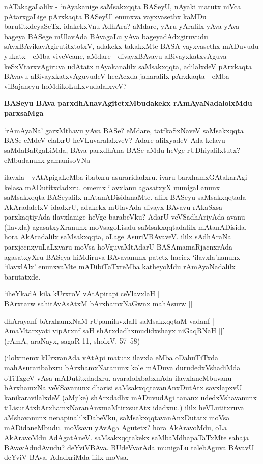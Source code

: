 nATakagaLalilx - `nAyakanige saMsakxqqta BASeyU, nAyaki matutx niVca pAtarxgaLige pArxkaqta BASeyU' enunxva vayxvasethx kaMDu barutitxdeyaSeTx. idakekxVnu AdhAra? aMdare, yAru yAralilx yAva yAva bageya BASege mUlavAda BAvagaLu yAva bageyadAdxgiruvudu sAvxBAvikavAgirutitxtotxV, adakekx takakxMte BASA vayxvasethx mADuvudu yukatx - eMba viveVcane, aMdare - divayxBAvavu aBivayxkatxvAguva keSxVtarxvAgiruva udAtatx nAyakanalilx saMsakxqqta, adilalxdeV pArxkaqta BAvavu aBivayxkatxvAguvudeV hecAcxda jana\-ralilx pArxkaqta - eMba viBajaneyu hoMdikoLuLxvudalalxveV?

{\bigskip
\noindent
{\large\bf BASeyu BAva parxdhAnavAgitetxMbudakekx rAmAyaNadalolxMdu parxsaMga}}\label{page13}
\medskip

\noindent
`rAmAyaNa' garxMthavu yAva BASe? eMdare, tatfkaSxNaveV saMsakxqqta BASe eMdeV elalxrU heVLuva\-ralalxveV? Adare alilxyadeV Ada kelavu saMdaBaRgaLiMda, BAva parxdhAna BASe aMdu heVge rUDhi\-yalilxtutx? eMbudanunx gamanisoVNa -

ilavxla - vAtApigaLeMba ibabxru asuraridadxru. ivaru barxhamxGAtakarAgi kelasa mADutitxdadxru. omemx ilavxlanu agasatxyX munigaLanunx saMsakxqqta BASeyalilx mAtanADisidanaMte. alilx BASeyu saMsakxqqtada AkAra\-dalelxV idadxrU, adakekx mUlavAda divayx BAvavu rAkaSxsa parxkaqtiyAda ilavxlanige heVge barabeVku? AdarU veVSadhAriyAda avanu (ilavxla) agasatxyXranunx moVsagoLisalu saMsakxqqtadalilx mAtanADisida. hora AkAradalilx saMsakxqqta, oLage AsuriVBAvaveV. ililx sAdhAraNa parxjecnxyuLaLxvaru moVsa hoVguvaMtAdarU BASAmamaRjacnxrAda agasatxyXru BASeya hiMdiruva BAvavanunx patetx hacicx `ilavxla'nanunx `ilavxlAlx' enunx\-vaMte mADibiTaTxreMba katheyoMdu rAmAyaNadalilx barutatxde.

\begin{shloka}
`iheYkadA kila kUrxroV vAtApirapi ceVlavxlaH |\\\label{13}
BArxtarw sahitAvAsAtxM bArxhamxNaGwnx mahAsurw ||\\
\end{shloka} 

\begin{shloka}
dhArayanf bArxhamxNaM rUpamilavxlaH saMsakxqqtaM vadanf |\\
AmaMtarxyati vipArxnf saH shArxdadhxmudidxshayx niGaqRNaH ||'\\[4pt]
\hfill{(rAmA, araNayx, sagaR 11, sholxV. 57--58)}
\end{shloka}  

\noindent
(ilolxmemx kUrxranAda vAtApi matutx ilavxla eMba oDahuTiTxda mahAsura\-ribabxru bArxhamxNa\-ranunx kole mADuva durudedxVshadiMda oTiTxgeV vAsa mADutitxdadxru. avara\-lolxbabxnAda ilavxla\-neMbu\-vanu bArxhamxNa\- veVSavanunx dharisi saMsakxqqtavanAnxDutAtx savxlapxvU kanikaravilalxdeV (aMjike) shArxdadhx mADuvudAgi tananx udedxVsha\-vanunx tiLisutAtx\break bArxhamxNaranAnxmaMtirxsutAtx idadxnu.) ililx heVLutitxruva aMshavanunx nenapinalilxDa\-beVku, saMsakxqqtavanAnxDutatx moVsa mADidaneMbudu. moVsavu yAvAga Agutetx? hora AkAravoMdu, oLa AkAravoMdu AdAgatAneV. saMsakxqqtakekx saMbaMdhapaTaTxMte sahaja BAvavAdudAvudu? deYviVBAva. BUdeVvarAda munigaLu talebAguva BAvavU deYviV BAva. AdadxriMda ililx moVsa.

